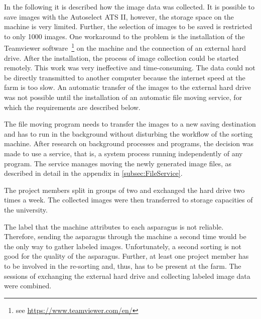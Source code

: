 \bigskip
In the following it is described how the image data was collected. It is possible to save images with the Autoselect ATS II, however, the storage space on the machine is very limited. Further, the selection of images to be saved is restricted to only 1000 images.
One workaround to the problem is the installation of the Teamviewer software~\footnote{see \url{https://www.teamviewer.com/en/}} on the machine and the connection of an external hard drive. After the installation, the process of image collection could be started remotely. This work was very ineffective and time-consuming. The data could not be directly transmitted to another computer because the internet speed at the farm is too slow. An automatic transfer of the images to the external hard drive was not possible until the installation of an automatic file moving service, for which the requirements are described below.

The file moving program needs to transfer the images to a new saving destination and has to run in the background without disturbing the workflow of the sorting machine. After research on background processes and programs, the decision was made to use a service, that is, a system process running independently of any program. The service manages moving the newly generated image files, as described in detail in the appendix in \autoref{subsec:FileService}.

The project members split in groups of two and exchanged the hard drive two times a week. The collected images were then transferred to storage capacities of the university.

The label that the machine attributes to each asparagus is not reliable. Therefore, sending the asparagus through the machine a second time would be the only way to gather labeled images. Unfortunately, a second sorting is not good for the quality of the asparagus. Further, at least one project member has to be involved in the re-sorting and, thus, has to be present at the farm. The sessions of exchanging the external hard drive and collecting labeled image data were combined.

